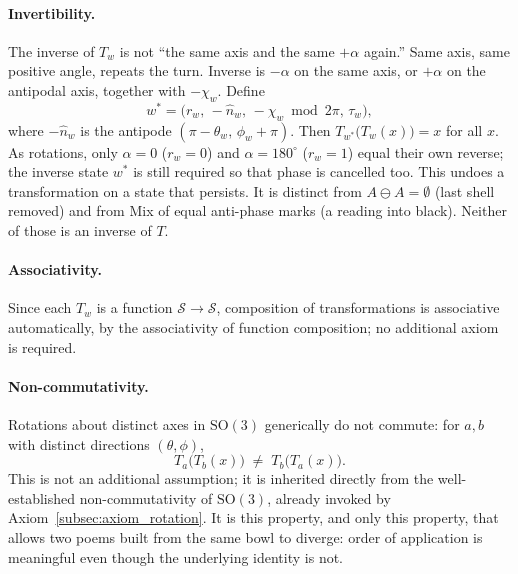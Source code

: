 \documentclass[12pt, a4paper]{article}
\begin{document}
\paragraph{Invertibility.}
The inverse of $T_w$ is not ``the same axis and the same $+\alpha$ again.'' Same axis, same positive angle, repeats the turn. Inverse is $-\alpha$ on the same axis, or $+\alpha$ on the antipodal axis, together with $-\chi_w$. Define
\begin{equation}
    w^{*} = \bigl(r_w,\,-\hat n_w,\,-\chi_w \bmod 2\pi,\,\tau_w\bigr),
\end{equation}
where $-\hat n_w$ is the antipode $(\pi-\theta_w,\,\phi_w+\pi)$.
Then $T_{w^{*}}\!\big(T_w(x)\big) = x$ for all $x$. As rotations, only $\alpha=0$ ($r_w=0$) and $\alpha=180^\circ$ ($r_w=1$) equal their own reverse; the inverse state $w^{*}$ is still required so that phase is cancelled too. This undoes a transformation on a state that persists. It is distinct from $A\ominus A=\emptyset$ (last shell removed) and from Mix of equal anti-phase marks (a reading into black). Neither of those is an inverse of $T$.

\paragraph{Associativity.} Since each $T_w$ is a function
$\mathcal{S} \to \mathcal{S}$, composition of transformations is
associative automatically, by the associativity of function
composition; no additional axiom is required.

\paragraph{Non-commutativity.} Rotations about distinct axes in
$\mathrm{SO}(3)$ generically do not commute: for $a, b$ with distinct
directions $(\theta,\phi)$,
\begin{equation}
    T_a\big(T_b(x)\big) \;\neq\; T_b\big(T_a(x)\big).
    \label{eq:noncommute}
\end{equation}
This is not an additional assumption; it is inherited directly from
the well-established non-commutativity of $\mathrm{SO}(3)$, already
invoked by Axiom~\ref{subsec:axiom_rotation}. It is this property,
and only this property, that allows two poems built from the same
bowl to diverge: order of application is meaningful even
though the underlying identity is not.
\end{document}
